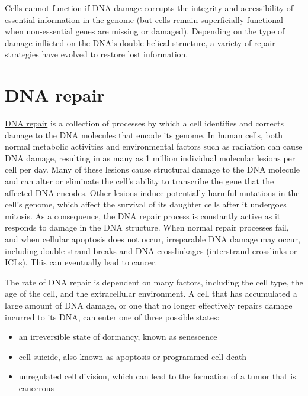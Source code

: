 Cells cannot function if DNA damage corrupts the integrity and accessibility of essential information in the genome (but cells remain superficially functional when non-essential genes are missing or damaged). Depending on the type of damage inflicted on the DNA's double helical structure, a variety of repair strategies have evolved to restore lost information.

\hypertarget{dna-repair}{%
\section{DNA repair}\label{dna-repair}}

\href{https://en.wikipedia.org/wiki/DNA_repair}{DNA repair} is a collection of processes by which a cell identifies and corrects damage to the DNA molecules that encode its genome. In human cells, both normal metabolic activities and environmental factors such as radiation can cause DNA damage, resulting in as many as 1 million individual molecular lesions per cell per day. Many of these lesions cause structural damage to the DNA molecule and can alter or eliminate the cell's ability to transcribe the gene that the affected DNA encodes. Other lesions induce potentially harmful mutations in the cell's genome, which affect the survival of its daughter cells after it undergoes mitosis. As a consequence, the DNA repair process is constantly active as it responds to damage in the DNA structure. When normal repair processes fail, and when cellular apoptosis does not occur, irreparable DNA damage may occur, including double-strand breaks and DNA crosslinkages (interstrand crosslinks or ICLs). This can eventually lead to cancer.

The rate of DNA repair is dependent on many factors, including the cell type, the age of the cell, and the extracellular environment. A cell that has accumulated a large amount of DNA damage, or one that no longer effectively repairs damage incurred to its DNA, can enter one of three possible states:

\begin{itemize}
\tightlist
\item
  an irreversible state of dormancy, known as senescence
\item
  cell suicide, also known as apoptosis or programmed cell death
\item
  unregulated cell division, which can lead to the formation of a tumor that is cancerous
\end{itemize}

